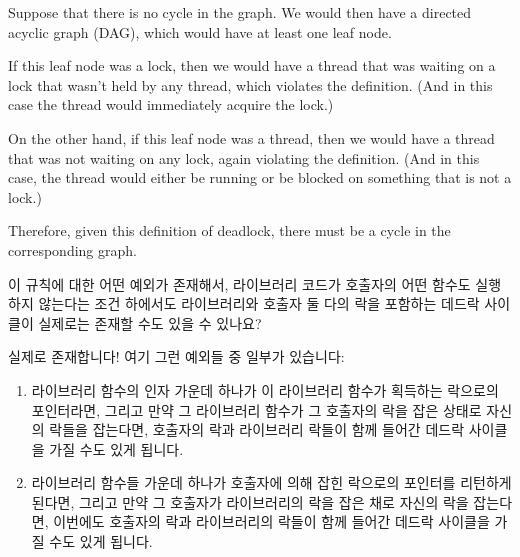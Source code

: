\begin{enumerate}
	Suppose that there is no cycle in the graph.
	We would then have a directed acyclic graph (DAG), which would
	have at least one leaf node.

	If this leaf node was a lock, then we would have a thread
	that was waiting on a lock that wasn't held by any thread,
	which violates the definition.
	(And in this case the thread would immediately acquire the
	lock.)

	On the other hand, if this leaf node was a thread, then
	we would have a thread that was not waiting on any lock,
	again violating the definition.
	(And in this case, the thread would either be running or
	be blocked on something that is not a lock.)

	Therefore, given this definition of deadlock, there must
	be a cycle in the corresponding graph.
	\fi

\QuickQ{}
	이 규칙에 대한 어떤 예외가 존재해서, 라이브러리 코드가 호출자의 어떤
	함수도 실행하지 않는다는 조건 하에서도 라이브러리와 호출자 둘 다의 락을
	포함하는 데드락 사이클이 실제로는 존재할 수도 있을 수 있나요?

\QuickA{}
	실제로 존재합니다!
	여기 그런 예외들 중 일부가 있습니다:

	\begin{enumerate}
	\item	라이브러리 함수의 인자 가운데 하나가 이 라이브러리 함수가
		획득하는 락으로의 포인터라면, 그리고 만약 그 라이브러리 함수가
		그 호출자의 락을 잡은 상태로 자신의 락들을 잡는다면, 호출자의
		락과 라이브러리 락들이 함께 들어간 데드락 사이클을 가질 수도
		있게 됩니다.
	\item	라이브러리 함수들 가운데 하나가 호출자에 의해 잡힌 락으로의
		포인터를 리턴하게 된다면, 그리고 만약 그 호출자가 라이브러리의
		락을 잡은 채로 자신의 락을 잡는다면, 이번에도 호출자의 락과
		라이브러리의 락들이 함께 들어간 데드락 사이클을 가질 수도 있게
		됩니다.
	\iffalse


\end{enumerate}
\end{enumerate}
